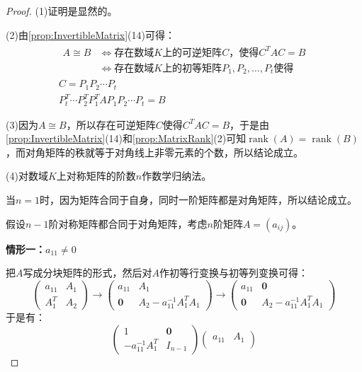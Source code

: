 \begin{proof}
	(1)证明是显然的。\par
	(2)由\cref{prop:InvertibleMatrix}(14)可得：
	\begin{gather*}
		\begin{aligned}
			A\cong B
			&\iff\text{存在数域$K$上的可逆矩阵$C$，使得}C^TAC=B \\
			&\iff\text{存在数域$K$上的初等矩阵$P_1,P_2,\dots,P_t$使得}
		\end{aligned}\\
		C=P_1P_2\cdots P_t \\
		P_t^T\cdots P_2^TP_1^TAP_1P_2\cdots P_t=B
	\end{gather*}\par
	(3)因为$A\cong B$，所以存在可逆矩阵$C$使得$C^TAC=B$，于是由\cref{prop:InvertibleMatrix}(14)和\cref{prop:MatrixRank}(2)可知$\operatorname{rank}(A)=\operatorname{rank}(B)$，而对角矩阵的秩就等于对角线上非零元素的个数，所以结论成立。\par
	(4)对数域$K$上对称矩阵的阶数$n$作数学归纳法。\par
	当$n=1$时，因为矩阵合同于自身，同时一阶矩阵都是对角矩阵，所以结论成立。\par
	假设$n-1$阶对称矩阵都合同于对角矩阵，考虑$n$阶矩阵$A=(a_{ij})$。\par
	\textbf{情形一：$a_{11}\ne 0$}\par
	把$A$写成分块矩阵的形式，然后对$A$作初等行变换与初等列变换可得：
	\begin{equation*}
		\begin{pmatrix}
			a_{11} & A_1 \\
			A_1^T & A_2
		\end{pmatrix}
		\longrightarrow
		\begin{pmatrix}
			a_{11} & A_1 \\
			\mathbf{0} & A_2-a_{11}^{-1}A_1^TA_1
		\end{pmatrix}
		\longrightarrow
		\begin{pmatrix}
			a_{11} & \mathbf{0} \\
			\mathbf{0} & A_2-a_{11}^{-1}A_1^TA_1
		\end{pmatrix}
	\end{equation*}
	于是有：
	\begin{equation*}
		\begin{pmatrix}
			1 & \mathbf{0} \\
			-a_{11}^{-1}A_1^T & I_{n-1}
		\end{pmatrix}
		\begin{pmatrix}
			a_{11} & A_1 \\

\end{pmatrix}
\end{equation*}
\end{proof}
